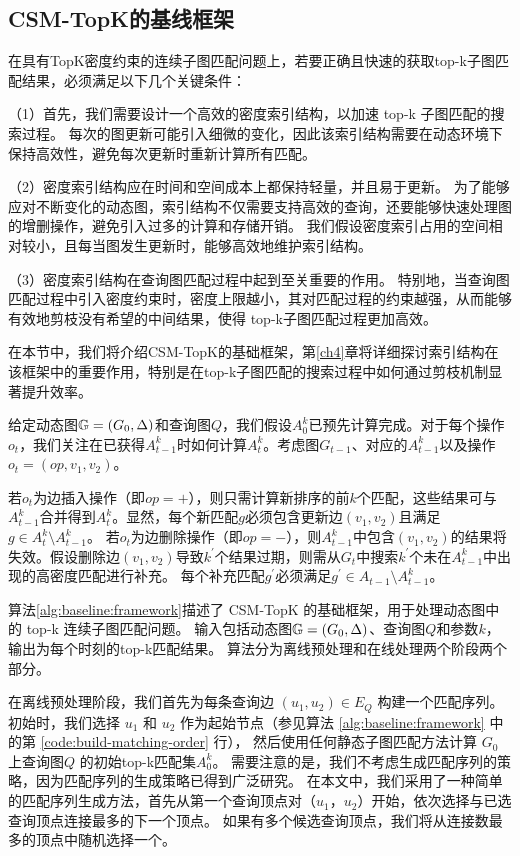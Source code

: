 \subsection{CSM-TopK的基线框架}
\label{ch3:base-framework}
在具有TopK密度约束的连续子图匹配问题上，若要正确且快速的获取top-k子图匹配结果，必须满足以下几个关键条件：

（1）首先，我们需要设计一个高效的密度索引结构，以加速 top-k 子图匹配的搜索过程。
每次的图更新可能引入细微的变化，因此该索引结构需要在动态环境下保持高效性，避免每次更新时重新计算所有匹配。

（2）密度索引结构应在时间和空间成本上都保持轻量，并且易于更新。
为了能够应对不断变化的动态图，索引结构不仅需要支持高效的查询，还要能够快速处理图的增删操作，避免引入过多的计算和存储开销。
我们假设密度索引占用的空间相对较小，且每当图发生更新时，能够高效地维护索引结构。

（3）密度索引结构在查询图匹配过程中起到至关重要的作用。
特别地，当查询图匹配过程中引入密度约束时，密度上限越小，其对匹配过程的约束越强，从而能够有效地剪枝没有希望的中间结果，使得 top-k子图匹配过程更加高效。

在本节中，我们将介绍CSM-TopK的基础框架，第\ref{ch4}章将详细探讨索引结构在该框架中的重要作用，特别是在top-k子图匹配的搜索过程中如何通过剪枝机制显著提升效率。


给定动态图$\mathbb{G}=(G_0, \Delta)$和查询图$Q$，我们假设$A_0^k$已预先计算完成。对于每个操作$o_t$，我们关注在已获得$A_{t-1}^k$时如何计算$A_t^k$。考虑图$G_{t-1}$、对应的$A_{t-1}^k$以及操作$o_t=(op, v_1, v_2)$。

若$o_t$为边插入操作（即$op=+$），则只需计算新排序的前$k$个匹配，这些结果可与$A_{t-1}^k$合并得到$A_t^k$。显然，每个新匹配$g$必须包含更新边$(v_1, v_2)$且满足$g\in A_t^k\setminus A_{t-1}^k$。
若$o_t$为边删除操作（即$op=-$），则$A_{t-1}^k$中包含$(v_1, v_2)$的结果将失效。假设删除边$(v_1, v_2)$导致$k^\prime$个结果过期，则需从$G_t$中搜索$k^\prime$个未在$A_{t-1}^k$中出现的高密度匹配进行补充。
每个补充匹配$g^\prime$必须满足$g^\prime \in A_{t-1} \setminus A_{t-1}^k$。

算法\ref{alg:baseline:framework}描述了 CSM-TopK 的基础框架，用于处理动态图中的 top-k 连续子图匹配问题。
输入包括动态图$\mathbb{G}=(G_0, \Delta)$、查询图$Q$和参数$k$，输出为每个时刻的top-k匹配结果。
算法分为离线预处理和在线处理两个阶段两个部分。

在离线预处理阶段，我们首先为每条查询边 $(u_1, u_2) \in E_Q$ 构建一个匹配序列。初始时，我们选择 $u_1$ 和 $u_2$ 作为起始节点（参见算法 \ref{alg:baseline:framework} 中的第 \ref{code:build-matching-order} 行），
然后使用任何静态子图匹配方法计算 $G_0$ 上查询图$Q$ 的初始top-k匹配集$A_0^k$。
需要注意的是，我们不考虑生成匹配序列的策略，因为匹配序列的生成策略已得到广泛研究。
在本文中，我们采用了一种简单的匹配序列生成方法，首先从第一个查询顶点对（$u_1$，$u_2$）开始，依次选择与已选查询顶点连接最多的下一个顶点。
如果有多个候选查询顶点，我们将从连接数最多的顶点中随机选择一个。

